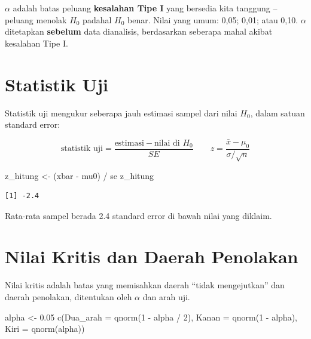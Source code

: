 \documentclass[
  indonesian,
  letterpaper,
]{book}
\newenvironment{Shaded}{\begin{snugshade}}{\end{snugshade}}
\newcommand{\AttributeTok}[1]{\textcolor[rgb]{0.40,0.45,0.13}{#1}}
\newcommand{\DecValTok}[1]{\textcolor[rgb]{0.68,0.00,0.00}{#1}}
\newcommand{\FloatTok}[1]{\textcolor[rgb]{0.68,0.00,0.00}{#1}}
\newcommand{\FunctionTok}[1]{\textcolor[rgb]{0.28,0.35,0.67}{#1}}
\newcommand{\NormalTok}[1]{\textcolor[rgb]{0.00,0.23,0.31}{#1}}
\newcommand{\OtherTok}[1]{\textcolor[rgb]{0.00,0.23,0.31}{#1}}
\newcommand{\SpecialCharTok}[1]{\textcolor[rgb]{0.37,0.37,0.37}{#1}}
\begin{document}
\(\alpha\) adalah batas peluang \textbf{kesalahan Tipe I} yang bersedia
kita tanggung -- peluang menolak \(H_0\) padahal \(H_0\) benar. Nilai
yang umum: 0,05; 0,01; atau 0,10. \(\alpha\) ditetapkan \textbf{sebelum}
data dianalisis, berdasarkan seberapa mahal akibat kesalahan Tipe I.

\section{Statistik Uji}\label{statistik-uji}

Statistik uji mengukur seberapa jauh estimasi sampel dari nilai \(H_0\),
dalam satuan standard error:

\[\text{statistik uji} = \frac{\text{estimasi} - \text{nilai di } H_0}{SE} \qquad z = \frac{\bar{x} - \mu_0}{\sigma/\sqrt{n}}\]

\begin{Shaded}
\begin{Highlighting}[]
\NormalTok{z\_hitung }\OtherTok{\textless{}{-}}\NormalTok{ (xbar }\SpecialCharTok{{-}}\NormalTok{ mu0) }\SpecialCharTok{/}\NormalTok{ se}
\NormalTok{z\_hitung}
\end{Highlighting}
\end{Shaded}

\begin{verbatim}
[1] -2.4
\end{verbatim}

Rata-rata sampel berada 2.4 standard error di bawah nilai yang diklaim.

\section{Nilai Kritis dan Daerah
Penolakan}\label{nilai-kritis-dan-daerah-penolakan}

Nilai kritis adalah batas yang memisahkan daerah ``tidak mengejutkan''
dan daerah penolakan, ditentukan oleh \(\alpha\) dan arah uji.

\begin{Shaded}
\begin{Highlighting}[]
\NormalTok{alpha }\OtherTok{\textless{}{-}} \FloatTok{0.05}
\FunctionTok{c}\NormalTok{(}\AttributeTok{Dua\_arah =} \FunctionTok{qnorm}\NormalTok{(}\DecValTok{1} \SpecialCharTok{{-}}\NormalTok{ alpha }\SpecialCharTok{/} \DecValTok{2}\NormalTok{), }\AttributeTok{Kanan =} \FunctionTok{qnorm}\NormalTok{(}\DecValTok{1} \SpecialCharTok{{-}}\NormalTok{ alpha), }\AttributeTok{Kiri =} \FunctionTok{qnorm}\NormalTok{(alpha))}
\end{Highlighting}
\end{Shaded}
\end{document}
